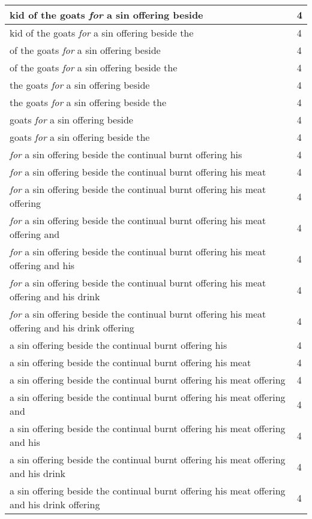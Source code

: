 \begin{center}
\begin{longtable}{|p{3.0in}|p{0.5in}|}
kid of the goats \emph{for} a sin offering beside & 4\\ \hline 
kid of the goats \emph{for} a sin offering beside the & 4\\ \hline 
of the goats \emph{for} a sin offering beside & 4\\ \hline 
of the goats \emph{for} a sin offering beside the & 4\\ \hline 
the goats \emph{for} a sin offering beside & 4\\ \hline 
the goats \emph{for} a sin offering beside the & 4\\ \hline 
goats \emph{for} a sin offering beside & 4\\ \hline 
goats \emph{for} a sin offering beside the & 4\\ \hline 
\emph{for} a sin offering beside the continual burnt offering his & 4\\ \hline 
\emph{for} a sin offering beside the continual burnt offering his meat & 4\\ \hline 
\emph{for} a sin offering beside the continual burnt offering his meat offering & 4\\ \hline 
\emph{for} a sin offering beside the continual burnt offering his meat offering and & 4\\ \hline 
\emph{for} a sin offering beside the continual burnt offering his meat offering and his & 4\\ \hline 
\emph{for} a sin offering beside the continual burnt offering his meat offering and his drink & 4\\ \hline 
\emph{for} a sin offering beside the continual burnt offering his meat offering and his drink offering & 4\\ \hline 
a sin offering beside the continual burnt offering his & 4\\ \hline 
a sin offering beside the continual burnt offering his meat & 4\\ \hline 
a sin offering beside the continual burnt offering his meat offering & 4\\ \hline 
a sin offering beside the continual burnt offering his meat offering and & 4\\ \hline 
a sin offering beside the continual burnt offering his meat offering and his & 4\\ \hline 
a sin offering beside the continual burnt offering his meat offering and his drink & 4\\ \hline 
a sin offering beside the continual burnt offering his meat offering and his drink offering & 4\\ \hline 

\end{longtable}
\end{center}
